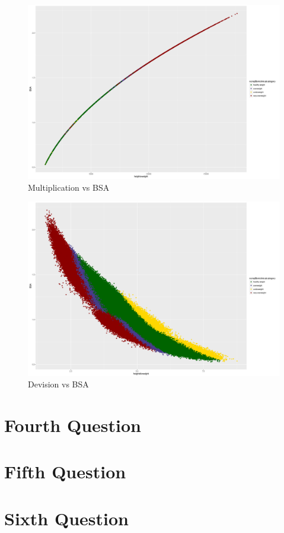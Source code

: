 \documentclass{article}
\begin{document}
		\begin{figure}[H]
			\begin{center}
				\includegraphics[scale=0.4]{xbsa.png}
			\end{center}
			\caption{Multiplication vs BSA}
		\end{figure}
				\begin{figure}[H]
					\begin{center}
						\includegraphics[scale=0.4]{divbsa.png}
					\end{center}
					\caption{Devision vs BSA}
				\end{figure}
	\section*{Fourth Question}
	\section*{Fifth Question}
	\section*{Sixth Question}
\end{document}
